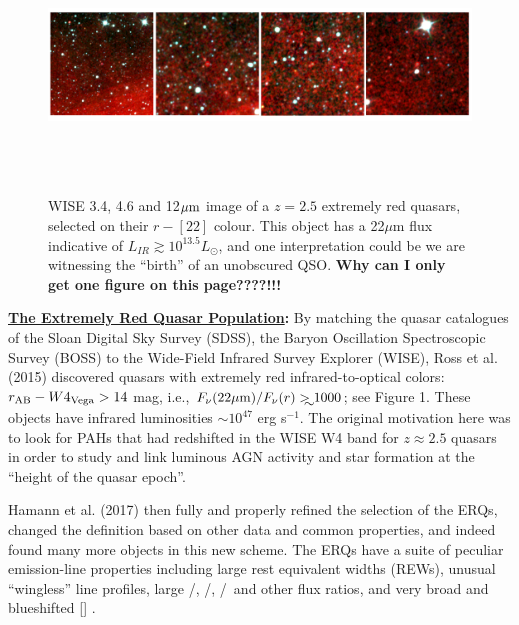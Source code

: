\medskip
\medskip

\setlength {\textwidth}{180mm} 
\begin{figure}[h]
  \begin{center}
    \hspace{-0.5cm}
    \includegraphics[height=6.0cm,width=17.8cm]{../Figures/ERQs_4inarow_crop.png}
    \vspace{-10pt}
    \caption{
      \footnotesize
      WISE 3.4, 4.6 and 12$\mu {\rm m}$ image of a $z=2.5$ 
      extremely red quasars, selected on their $r-[22]$ colour. This object
      has a 22$\mu$m flux indicative of $L_{IR} \gtrsim 10^{13.5} L_{\odot}$, 
      and one interpretation could be we are witnessing the
      ``birth'' of an unobscured QSO.  
 {\bf Why can I only get one figure on this page????!!!}
}
    \vspace{-14pt}
    \label{figtest-fig}
  \end{center}
\end{figure}

\smallskip
\smallskip
\noindent
{\bf \underline{The Extremely Red Quasar Population}:} By matching the
quasar catalogues of the Sloan Digital Sky Survey (SDSS), the Baryon
Oscillation Spectroscopic Survey (BOSS) to the Wide-Field Infrared
Survey Explorer (WISE), Ross et al. (2015) discovered quasars with
extremely red infrared-to-optical colors: $r_{\rm AB}-W4_{\rm
Vega}>14$ mag, i.e., $F_\nu({\rm 22\mu m})/F_\nu(r) \gtrsim 1000$; see
Figure 1. These objects have infrared luminosities $\sim 10^{47}$ erg
s$^{-1}$.  The original motivation here was to look for PAHs that had
redshifted in the WISE W4 band for $z\approx2.5$ quasars in order to
study and link luminous AGN activity and star formation at the
``height of the quasar epoch''.

\smallskip
\smallskip
\noindent
Hamann et al. (2017) then fully and properly refined the selection of
the ERQs, changed the definition based on other data and common
properties, and indeed found many more objects in this new scheme. The
ERQs have a suite of peculiar emission-line properties including large
rest equivalent widths (REWs), unusual ``wingless'' line profiles,
large \nv /\lya , \nv /\civ , \siiv /\civ\ and other flux ratios, and
very broad and blueshifted [\oiii ] .


